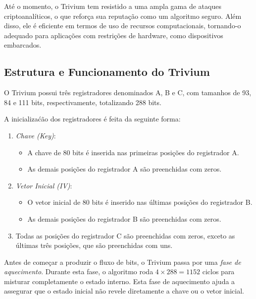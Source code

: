 Até o momento, o Trivium tem resistido a uma ampla gama de ataques criptoanalíticos, o que reforça sua reputação como um algoritmo seguro.
Além disso, ele é eficiente em termos de uso de recursos computacionais, tornando-o adequado para aplicações com restrições de hardware, como dispositivos embarcados.

\subsection*{Estrutura e Funcionamento do Trivium}

O Trivium possui três registradores denominados A, B e C, com tamanhos de 93, 84 e 111 bits, respectivamente, totalizando 288 bits.

A inicializaćão dos registradores é feita da seguinte forma:

\begin{enumerate}
\item {\em Chave (Key)}:
  \begin{itemize}
  \item A chave de 80 bits é inserida nas primeiras posições do registrador A.
  \item As demais posições do registrador A são preenchidas com zeros.
  \end{itemize}
  
\item {\em Vetor Inicial (IV)}:
  \begin{itemize}
  \item O vetor inicial de 80 bits é inserido nas últimas posições do registrador B.
  \item As demais posições do registrador B são preenchidas com zeros.
  \end{itemize}
    
\item Todas as posições do registrador C são preenchidas com zeros, exceto as últimas três posições, que são preenchidas com uns.    
\end{enumerate}

Antes de começar a produzir o fluxo de bits, o Trivium passa por uma {\em fase de aquecimento}.
Durante esta fase, o algoritmo roda $4 \times 288 = 1152$ ciclos para misturar completamente o estado interno.
Esta fase de aquecimento ajuda a assegurar que o estado inicial não revele diretamente a chave ou o vetor inicial.

